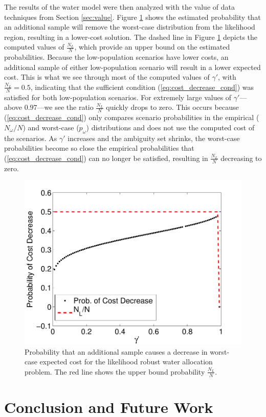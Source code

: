 \documentclass[11pt]{article}
\begin{document}
The results of the water model were then analyzed with the value of data techniques from Section \ref{sec:value}.
Figure \ref{fig:water_prob_decrease} shows the estimated probability that an additional sample will remove the worst-case distribution from the likelihood region, resulting in a lower-cost solution. %
The dashed line in Figure \ref{fig:water_prob_decrease} depicts the computed values of $\frac{N_L}{N}$, which provide an upper bound on the estimated probabilities. 
Because the low-population scenarios have lower costs, an additional sample of either low-population scenario will result in a lower expected cost.
This is what we see through most of the computed values of $\gamma'$, with $\frac{N_L}{N} = 0.5$, indicating that the sufficient condition (\ref{eq:cost_decrease_cond}) was satisfied for both low-population scenarios.
For extremely large values of $\gamma'$---above $0.97$---we see the ratio $\frac{N_L}{N}$ quickly drops to zero.
This occurs because (\ref{eq:cost_decrease_cond}) only compares scenario probabilities in the empirical ($N_\omega / N$) and worst-case ($p_\omega$) distributions and does not use the computed cost of the scenarios.
As $\gamma'$ increases and the ambiguity set shrinks, the worst-case probabilities become so close the empirical probabilities that (\ref{eq:cost_decrease_cond}) can no longer be satisfied, resulting in $\frac{N_L}{N}$ decreasing to zero.

\begin{figure}
	\centering
	\includegraphics[width=.5\textwidth]{images/water_prob_decrease}
	\caption{Probability that an additional sample causes a decrease in worst-case expected cost for the likelihood robust water allocation problem.  The red line shows the upper bound probability $\tfrac{N_L}{N}$.}
	\label{fig:water_prob_decrease}
\end{figure}

\section{Conclusion and Future Work}
\label{sec:concl}
\end{document}
